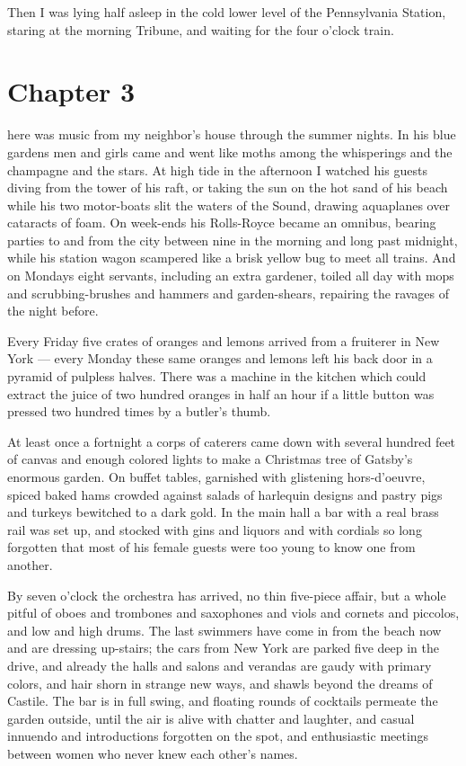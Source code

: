\documentclass{znotebook}
\begin{document}
Then I was lying half asleep in the cold lower level of the Pennsylvania Station, staring at the morning Tribune, and waiting for the four o'clock train.

\chapter{Chapter 3}

\lettrine[findent=2pt]{}{ }here was music from my neighbor's house through the summer nights. In his blue gardens men and girls came and went like moths among the whisperings and the champagne and the stars. At high tide in the afternoon I watched his guests diving from the tower of his raft, or taking the sun on the hot sand of his beach while his two motor-boats slit the waters of the Sound, drawing aquaplanes over cataracts of foam. On week-ends his Rolls-Royce became an omnibus, bearing parties to and from the city between nine in the morning and long past midnight, while his station wagon scampered like a brisk yellow bug to meet all trains. And on Mondays eight servants, including an extra gardener, toiled all day with mops and scrubbing-brushes and hammers and garden-shears, repairing the ravages of the night before.

Every Friday five crates of oranges and lemons arrived from a fruiterer in New York — every Monday these same oranges and lemons left his back door in a pyramid of pulpless halves. There was a machine in the kitchen which could extract the juice of two hundred oranges in half an hour if a little button was pressed two hundred times by a butler's thumb.

At least once a fortnight a corps of caterers came down with several hundred feet of canvas and enough colored lights to make a Christmas tree of Gatsby's enormous garden. On buffet tables, garnished with glistening hors-d'oeuvre, spiced baked hams crowded against salads of harlequin designs and pastry pigs and turkeys bewitched to a dark gold. In the main hall a bar with a real brass rail was set up, and stocked with gins and liquors and with cordials so long forgotten that most of his female guests were too young to know one from another.

By seven o'clock the orchestra has arrived, no thin five-piece affair, but a whole pitful of oboes and trombones and saxophones and viols and cornets and piccolos, and low and high drums. The last swimmers have come in from the beach now and are dressing up-stairs; the cars from New York are parked five deep in the drive, and already the halls and salons and verandas are gaudy with primary colors, and hair shorn in strange new ways, and shawls beyond the dreams of Castile. The bar is in full swing, and floating rounds of cocktails permeate the garden outside, until the air is alive with chatter and laughter, and casual innuendo and introductions forgotten on the spot, and enthusiastic meetings between women who never knew each other's names.
\end{document}
